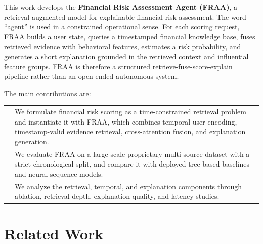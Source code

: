 \documentclass[runningheads]{llncs}
\begin{document}
This work develops the \textbf{Financial Risk Assessment Agent (FRAA)}, a retrieval-augmented model for explainable financial risk assessment. The word ``agent'' is used in a constrained operational sense. For each scoring request, FRAA builds a user state, queries a timestamped financial knowledge base, fuses retrieved evidence with behavioral features, estimates a risk probability, and generates a short explanation grounded in the retrieved context and influential feature groups. FRAA is therefore a structured retrieve-fuse-score-explain pipeline rather than an open-ended autonomous system.

The main contributions are:
\par\noindent\begin{tabular}{@{}p{1.4em}@{}p{\dimexpr\linewidth-1.4em\relax}@{}}
\textemdash{} & We formulate financial risk scoring as a time-constrained retrieval problem and instantiate it with FRAA, which combines temporal user encoding, timestamp-valid evidence retrieval, cross-attention fusion, and explanation generation.\\
\textemdash{} & We evaluate FRAA on a large-scale proprietary multi-source dataset with a strict chronological split, and compare it with deployed tree-based baselines and neural sequence models.\\
\textemdash{} & We analyze the retrieval, temporal, and explanation components through ablation, retrieval-depth, explanation-quality, and latency studies.
\end{tabular}

\section{Related Work}
\end{document}
